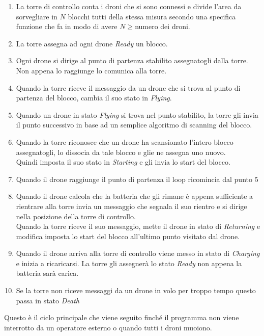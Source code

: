 \documentclass[a4paper, 12pt]{report}
\begin{document}
\begin{enumerate}
    
    \item La torre di controllo conta i droni che si sono connessi e divide l'area da sorvegliare in $N$ blocchi tutti della stessa misura secondo una specifica funzione che fa in modo di avere $N \ge $numero dei droni.

    \item La torre assegna ad ogni drone \textit{Ready} un blocco.

    \item Ogni drone si dirige al punto di partenza stabilito assegnatogli dalla torre. Non appena lo raggiunge lo comunica alla torre.

    \item Quando la torre riceve il messaggio da un drone che si trova al punto di partenza del blocco, cambia il suo stato in \textit{Flying}.

    \item Quando un drone in stato \textit{Flying} si trova nel punto stabilito, la torre gli invia il punto successivo in base ad un semplice algoritmo di scanning del blocco.

    \item Quando la torre riconosce che un drone ha scansionato l'intero blocco assegnatogli, lo dissocia da tale blocco e glie ne assegna uno nuovo.\\ Quindi imposta il suo stato in \textit{Starting} e gli invia lo start del blocco. 

    \item Quando il drone raggiunge il punto di partenza il loop ricomincia dal punto $5$

    \item Quando il drone calcola che la batteria che gli rimane è appena sufficiente a rientrare alla torre invia un messaggio che segnala il suo rientro e si dirige nella posizione della torre di controllo.
    \\Quando la torre riceve il suo messaggio, mette il drone in stato di \textit{Returning} e modifica imposta lo start del blocco all'ultimo punto visitato dal drone.

    \item Quando il drone arriva alla torre di controllo viene messo in stato di \textit{Charging} e inizia a ricaricarsi.
    La torre gli assegnerà lo stato \textit{Ready} non appena la batteria sarà carica.

    \item Se la torre non riceve messaggi da un drone in volo per troppo tempo questo passa in stato \textit{Death}
\end{enumerate}
Questo è il ciclo principale che viene seguito finché il programma non viene interrotto da un operatore esterno o quando tutti i droni muoiono.
\end{document}
